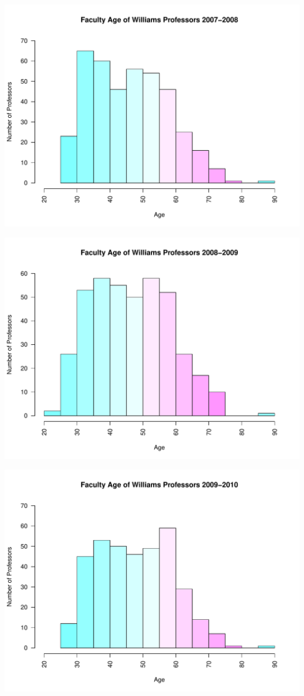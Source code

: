 \documentclass[12pt,a4paper]{article}\usepackage[]{graphicx}\usepackage[]{color}
\makeatletter
\def\maxwidth{ %
  \ifdim\Gin@nat@width>\linewidth
    \linewidth
  \else
    \Gin@nat@width
  \fi
}
\newenvironment{knitrout}{}{} %
\theoremstyle{definition}
\makeatother
\begin{document}
\begin{knitrout}
\includegraphics[width=\maxwidth]{figure/unnamed-chunk-8-4} 

\includegraphics[width=\maxwidth]{figure/unnamed-chunk-8-5} 

\includegraphics[width=\maxwidth]{figure/unnamed-chunk-8-6} 


\end{knitrout}
\end{document}
